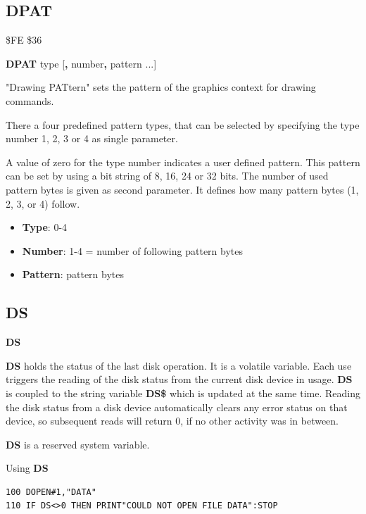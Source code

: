 
\newpage
\subsection{DPAT}
\begin{description}[leftmargin=2cm,style=nextline]
\item [Token:] \$FE \$36
\item [Format:] {\bf DPAT} type [{\bf,} number{\bf,} pattern ...]
\item [Usage:]
   "Drawing PATtern" sets the pattern
   of the graphics context for drawing commands.

   There a four predefined pattern types, that can be selected
   by specifying the type number 1, 2, 3 or 4 as single parameter.

   A value of zero for the type number indicates a user defined pattern.
   This pattern can be set by using a bit string of 8, 16, 24 or 32 bits.
   The number of used pattern bytes is given as second parameter.
   It defines how many pattern bytes (1, 2, 3, or 4) follow.

    \begin{itemize}
       \item {\bf Type}:    0-4
       \item {\bf Number}:  1-4 = number of following pattern bytes
       \item {\bf Pattern}: pattern bytes
    \end{itemize}
\end{description}


\newpage
\subsection{DS}
\begin{description}[leftmargin=2cm,style=nextline]
\item [Format:] {\bf DS}
\item [Usage:]  {\bf DS} holds the status of the last disk operation.
                It is a volatile variable.
                Each use triggers the reading of the disk status
                from the current disk device in usage.
                {\bf DS} is coupled to the string variable {\bf DS\$}
                which is updated at the same time.
                Reading the disk status from a disk device automatically
                clears any error status on that device, so subsequent reads
                will return 0, if no other activity was in between.
\item[Remarks:] {\bf DS} is a reserved system variable.

\item [Example:] Using {\bf DS}
\begin{tcolorbox}[colback=black,coltext=white]
\verbatimfont{\codefont}
\begin{verbatim}
100 DOPEN#1,"DATA"
110 IF DS<>0 THEN PRINT"COULD NOT OPEN FILE DATA":STOP
\end{verbatim}
\end{tcolorbox}
\end{description}

